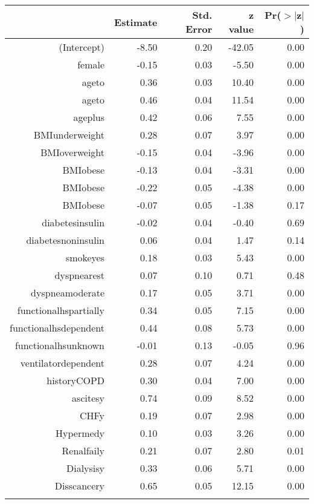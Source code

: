 \bigskip\bigskip
\centering
\begin{tabular}{rrrrr}
  \hline
 & Estimate & Std. Error & z value & Pr($>$$|$z$|$) \\ 
  \hline
(Intercept) & -8.50 & 0.20 & -42.05 & 0.00 \\ 
  female & -0.15 & 0.03 & -5.50 & 0.00 \\ 
  age\-65\-to\-74 & 0.36 & 0.03 & 10.40 & 0.00 \\ 
  age\-75\-to\-84 & 0.46 & 0.04 & 11.54 & 0.00 \\ 
  age\-85\-plus & 0.42 & 0.06 & 7.55 & 0.00 \\ 
  BMI\-underweight & 0.28 & 0.07 & 3.97 & 0.00 \\ 
  BMI\-overweight & -0.15 & 0.04 & -3.96 & 0.00 \\ 
  BMI\-obese\-1 & -0.13 & 0.04 & -3.31 & 0.00 \\ 
  BMI\-obese\-2 & -0.22 & 0.05 & -4.38 & 0.00 \\ 
  BMI\-obese\-3 & -0.07 & 0.05 & -1.38 & 0.17 \\ 
  diabetes\-insulin & -0.02 & 0.04 & -0.40 & 0.69 \\ 
  diabetes\-noninsulin & 0.06 & 0.04 & 1.47 & 0.14 \\ 
  smoke\-yes & 0.18 & 0.03 & 5.43 & 0.00 \\ 
  dyspnea\-rest & 0.07 & 0.10 & 0.71 & 0.48 \\ 
  dyspnea\-moderate & 0.17 & 0.05 & 3.71 & 0.00 \\ 
  functional\-hs\-partially & 0.34 & 0.05 & 7.15 & 0.00 \\ 
  functional\-hs\-dependent & 0.44 & 0.08 & 5.73 & 0.00 \\ 
  functional\-hs\-unknown & -0.01 & 0.13 & -0.05 & 0.96 \\ 
  ventilator\-dependent & 0.28 & 0.07 & 4.24 & 0.00 \\ 
  history\-COPD & 0.30 & 0.04 & 7.00 & 0.00 \\ 
  ascites\-y & 0.74 & 0.09 & 8.52 & 0.00 \\ 
  CHF\-y & 0.19 & 0.07 & 2.98 & 0.00 \\ 
  Hyper\-med\-y & 0.10 & 0.03 & 3.26 & 0.00 \\ 
  Renal\-fail\-y & 0.21 & 0.07 & 2.80 & 0.01 \\ 
  Dialysis\-y & 0.33 & 0.06 & 5.71 & 0.00 \\ 
  Diss\-cancer\-y & 0.65 & 0.05 & 12.15 & 0.00 \\ 
$$
\end{tabular}
